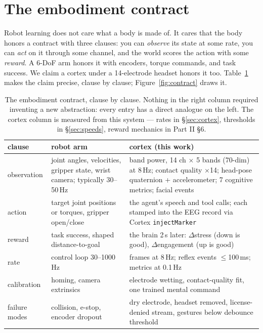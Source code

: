 \documentclass{article}
\begin{document}
\section{The embodiment contract}
\label{sec:contract}

Robot learning does not care what a body is made of. It cares that the body honors a contract with three clauses: you can \emph{observe} its state at some rate, you can \emph{act} on it through some channel, and the world scores the action with some \emph{reward}. A 6-DoF arm honors it with encoders, torque commands, and task success. We claim a cortex under a 14-electrode headset honors it too. Table~\ref{tab:contract} makes the claim precise, clause by clause; Figure~\ref{fig:contract} draws it.

\begin{table}[h]
\centering
\small
\begin{tabular}{@{}p{2.2cm}p{5.4cm}p{5.9cm}@{}}
\toprule
\textbf{clause} & \textbf{robot arm} & \textbf{cortex (this work)} \\
\midrule
observation &
joint angles, velocities, gripper state, wrist camera; typically 30--50\,Hz &
band power, 14 ch $\times$ 5 bands (70-dim) at 8\,Hz; contact quality $\times$14; head-pose quaternion + accelerometer; 7 cognitive metrics; facial events \\
\addlinespace
action &
target joint positions or torques, gripper open/close &
the agent's speech and tool calls; each stamped into the EEG record via Cortex \texttt{injectMarker} \\
\addlinespace
reward &
task success, shaped distance-to-goal &
the brain 2\,s later: $\Delta$stress (down is good), $\Delta$engagement (up is good) \\
\addlinespace
rate &
control loop 30--1000\,Hz &
frames at 8\,Hz; reflex events $\le$100\,ms; metrics at 0.1\,Hz \\
\addlinespace
calibration &
homing, camera extrinsics &
electrode wetting, contact-quality fit, one trained mental command \\
\addlinespace
failure modes &
collision, e-stop, encoder dropout &
dry electrode, headset removed, license-denied stream, gestures below debounce threshold \\
\bottomrule
\end{tabular}
\caption{The embodiment contract, clause by clause. Nothing in the right column required inventing a new abstraction: every entry has a direct analogue on the left. The cortex column is measured from this system --- rates in \S\ref{sec:cortex}, thresholds in \S\ref{sec:speeds}, reward mechanics in Part II \S6.}
\label{tab:contract}
\end{table}
\end{document}
